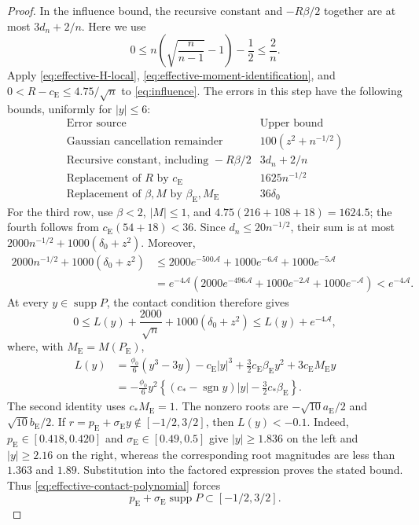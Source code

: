 \documentclass[aop]{imsart}
\theoremstyle{plain}
\theoremstyle{definition}
\theoremstyle{definition}
\newcommand{\ce}{c_{\mathrm E}}
\newcommand{\pe}{p_{\mathrm E}}
\newcommand{\se}{\sigma_{\mathrm E}}
\newcommand{\be}{\beta_{\mathrm E}}
\newcommand{\Pe}{P_{\mathrm E}}
\newcommand{\aE}{a_{\mathrm E}}
\newcommand{\bE}{b_{\mathrm E}}
\DeclareMathOperator{\supp}{supp}
\DeclareMathOperator{\sgn}{sgn}
\begin{document}
\begin{proof}
In the influence bound, the recursive constant and $-R\beta/2$
together are at most $3d_n+2/n$.  Here we use
\[
 0\le n\left(\sqrt{\frac n{n-1}}-1\right)-\frac12\le\frac2n.
\]
Apply \eqref{eq:effective-H-local},
\eqref{eq:effective-moment-identification}, and
$0<R-\ce\le4.75/\sqrt n$ to \eqref{eq:influence}.
The errors in this step have the following bounds, uniformly for
$|y|\le6$:
\[
\begin{array}{ll}
\text{Error source}&\text{Upper bound}\\[2pt]
\hline
\text{Gaussian cancellation remainder}
 &100(z^2+n^{-1/2})\\
\text{Recursive constant, including }-R\beta/2
 &3d_n+2/n\\
\text{Replacement of }R\text{ by }\ce
 &1625n^{-1/2}\\
\text{Replacement of }\beta,M\text{ by }\be,M_{\mathrm E}
 &36\delta_0
\end{array}
\]
For the third row, use $\beta<2$, $|M|\le1$, and
$4.75(216+108+18)=1624.5$; the fourth follows from
$\ce(54+18)<36$.
Since $d_n\le20n^{-1/2}$, their sum is at most
$2000n^{-1/2}+1000(\delta_0+z^2)$.  Moreover,
\[
 \begin{split}
 2000n^{-1/2}+1000(\delta_0+z^2)
 &\le2000e^{-500\mathcal A}
       +1000e^{-6\mathcal A}+1000e^{-5\mathcal A}\\
 &=e^{-4\mathcal A}
   \left(2000e^{-496\mathcal A}
        +1000e^{-2\mathcal A}+1000e^{-\mathcal A}\right)
 <e^{-4\mathcal A}.
 \end{split}
\]
At every $y\in\supp P$, the contact condition therefore gives
\begin{equation}\label{eq:effective-contact-polynomial}
 0\le L(y)+\frac{2000}{\sqrt n}
                  +1000(\delta_0+z^2)
 \le L(y)+e^{-4\mathcal A},
\end{equation}
where, with $M_{\mathrm E}=M(\Pe)$,
\begin{align*}
 L(y)
 &=\frac{\phi_0}{6}(y^3-3y)-\ce|y|^3
       +\frac32\ce\be y^2+3\ce M_{\mathrm E}y\\
 &=-\frac{\phi_0}{6}y^2
    \left\{(c_*-\sgn y)|y|-\frac32c_*\be\right\}.
\end{align*}
The second identity uses $c_*M_{\mathrm E}=1$.
The nonzero roots are $-\sqrt{10}\aE/2$ and $\sqrt{10}\bE/2$.
If $r=\pe+\se y\notin[-1/2,3/2]$, then $L(y)<-0.1$.
Indeed, $\pe\in[0.418,0.420]$ and $\se\in[0.49,0.5]$ give
$|y|\ge1.836$ on the left and $|y|\ge2.16$ on the right,
whereas the corresponding root magnitudes are less than $1.363$
and $1.89$.  Substitution into the factored expression proves
the stated bound.  Thus \eqref{eq:effective-contact-polynomial}
forces
\begin{equation}\label{eq:effective-coarse-support}
 \pe+\se\supp P\subset[-1/2,3/2].
\end{equation}


\end{proof}
\end{document}
